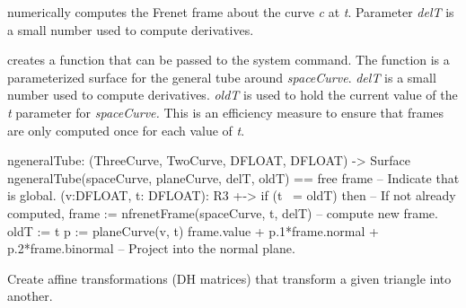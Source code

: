 numerically computes the Frenet frame
about the curve {\it c} at {\it t}.
Parameter {\it delT} is a small number used to
compute derivatives.

creates a function that can be passed to the system  command.
The function is a parameterized surface for the general tube
around {\it spaceCurve}.  {\it delT} is a small number used to compute
derivatives. {\it oldT} is used to hold the current value of the
{\it t} parameter for {\it spaceCurve.}  This is an efficiency measure
to ensure that frames are only computed once for each value of {\it t}.
\begin{xmpLinesNoResetPlain}
ngeneralTube: (ThreeCurve, TwoCurve, DFLOAT, DFLOAT) -> Surface
ngeneralTube(spaceCurve, planeCurve, delT, oldT) ==
  free frame                                             -- Indicate that  is global.
  (v:DFLOAT, t: DFLOAT): R3 +->
    if (t ~= oldT) then                                  -- If not already computed,
      frame := nfrenetFrame(spaceCurve, t, delT)         -- \quad{}compute new frame.
      oldT := t
    p := planeCurve(v, t)
    frame.value + p.1*frame.normal + p.2*frame.binormal  -- Project  into the normal plane.
\end{xmpLinesNoResetPlain}

%
%
Create affine transformations (DH matrices) that transform
a given triangle into another.

